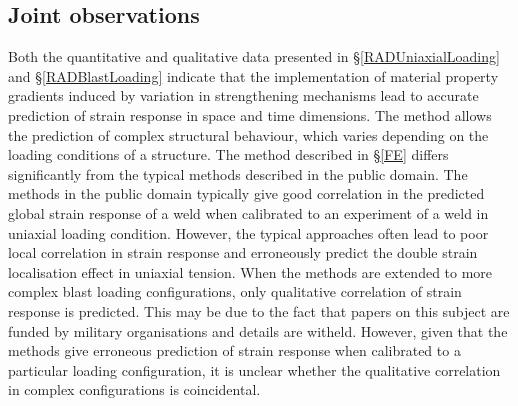 \subsection{Joint observations}
Both the quantitative and qualitative data presented in \S\ref{RADUniaxialLoading} and \S\ref{RADBlastLoading} indicate that the implementation of material property gradients induced by variation in strengthening mechanisms lead to accurate prediction of strain response in space and time dimensions. The method allows the prediction of complex structural behaviour, which varies depending on the loading conditions of a structure. 
The method described in \S\ref{FE} differs significantly from the typical methods described in the public domain. The methods in the public domain typically give good correlation in the predicted global strain response of a weld when calibrated to an experiment of a weld in uniaxial loading condition. However, the typical approaches often lead to poor local correlation in strain response and erroneously predict the double strain localisation effect in uniaxial tension. When the methods are extended to more complex blast loading configurations, only qualitative correlation of strain response is predicted. This may be due to the fact that papers on this subject are funded by military organisations and details are witheld. However, given that the methods give erroneous prediction of strain response when calibrated to a particular loading configuration, it is unclear whether the qualitative correlation in complex configurations is coincidental. 
